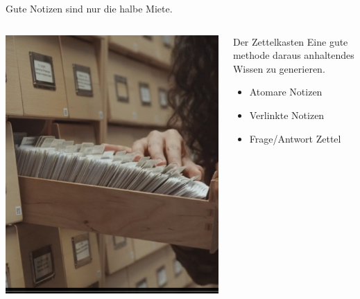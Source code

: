 \documentclass[aspectratio=169,shownotes]{beamer}
\begin{document}
\begin{frame}{Gute Notizen sind nur die halbe Miete. }
    \begin{columns}
        \begin{column}{0.4\textwidth}
            \includegraphics[width=\textwidth]{graphics/Zettelkasten.png}
        \end{column}
        \begin{column}{0.6\textwidth}   
            \begin{block}{Der Zettelkasten}
                Eine gute methode daraus anhaltendes Wissen zu generieren.
                \begin{itemize}
                    \item Atomare Notizen
                    \item Verlinkte Notizen
                    \item Frage/Antwort Zettel
                \end{itemize} 
            \end{block}                     
        \end{column}        
    \end{columns}    
\end{frame}
\end{document}

